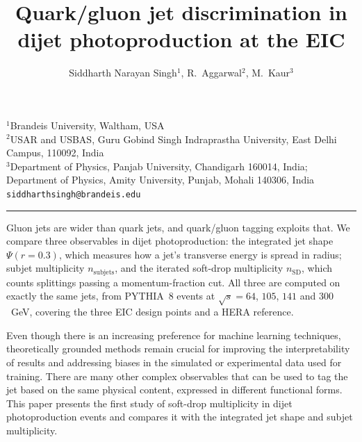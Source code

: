 \documentclass[11pt,a4paper]{article}
\title{\vspace{-1.5cm}\bfseries Quark/gluon jet discrimination in dijet photoproduction at the EIC}
\author{%
  Siddharth Narayan Singh$^{1}$,\quad
  R.~Aggarwal$^{2}$,\quad
  M.~Kaur$^{3}$
}
\date{}
\begin{document}
\maketitle
\thispagestyle{empty}
\vspace{-1.2cm}

{\small
$^{1}$Brandeis University, Waltham, USA \\
$^{2}$USAR and USBAS, Guru Gobind Singh Indraprastha University,
East Delhi Campus, 110092, India \\
$^{3}$Department of Physics, Panjab University, Chandigarh 160014, India;
Department of Physics, Amity University, Punjab, Mohali 140306, India \\[0.3em]
\texttt{siddharthsingh@brandeis.edu}
}

\vspace{0.8em}
\hrule
\vspace{1.0em}

Gluon jets are wider than quark jets, and quark/gluon tagging exploits that. We compare three observables in dijet
photoproduction: the integrated jet shape $\Psi(r=0.3)$, which measures how a
jet's transverse energy is spread in radius; subjet
multiplicity $n_{\mathrm{subjets}}$, and the iterated soft-drop multiplicity $n_{\mathrm{SD}}$, which
counts splittings passing a momentum-fraction cut. All three are computed on
exactly the same jets, from PYTHIA~8 events at $\sqrt{s} = 64$,
$105$, $141$ and $300$~GeV, covering the three EIC design points and a HERA
reference.

Even though there is an increasing preference for machine learning techniques,
theoretically grounded methods remain crucial for improving the interpretability
of results and addressing biases in the simulated or experimental data used for
training. There are many other complex observables that can be used to tag the
jet based on the same physical content, expressed in different functional forms.
This paper presents the first study of soft-drop multiplicity in dijet
photoproduction events and compares it with the integrated jet shape and subjet
multiplicity.
\end{document}
